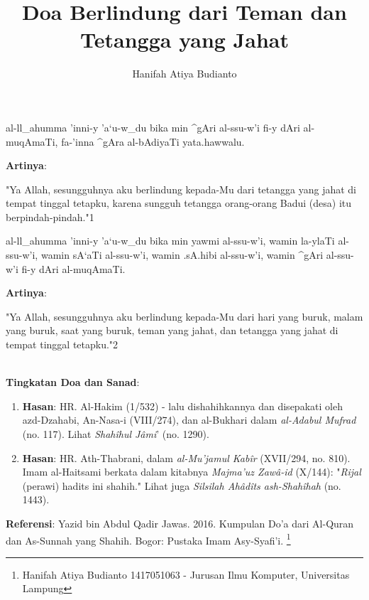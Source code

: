 \documentclass[a4paper,12pt]{article}
\title{\Large Doa Berlindung dari Teman dan Tetangga yang Jahat}
\author{\calligra Hanifah Atiya Budianto}
\begin{document}
\sffamily
\maketitle 
\fullvocalize
{}
\begin{arabtext}
\noindent
al-ll_ahumma 'inni-y 'a`u-w_du bika min ^gAri al-ssu-w'i fi-y dAri 
al-muqAmaTi, fa-'inna ^gAra al-bAdiyaTi yata.hawwalu.\\
\end{arabtext}
\noindent
\textbf{Artinya}:
\par
\indent
"Ya Allah, sesungguhnya aku berlindung kepada-Mu dari tetangga yang jahat 
di tempat tinggal tetapku, karena sungguh tetangga orang-orang Badui (desa)
itu berpindah-pindah."{\scriptsize 1}\\
\begin{arabtext}
\noindent
al-ll_ahumma 'inni-y 'a`u-w_du bika min yawmi al-ssu-w'i, wamin la-ylaTi 
al-ssu-w'i, wamin sA`aTi al-ssu-w'i, wamin .sA.hibi al-ssu-w'i, 
wamin ^gAri al-ssu-w'i fi-y dAri al-muqAmaTi.\\
\end{arabtext}
\noindent
\textbf{Artinya}:
\par
\indent
"Ya Allah, sesungguhnya aku berlindung kepada-Mu dari hari yang buruk, 
malam yang buruk, saat yang buruk, teman yang jahat, dan tetangga yang 
jahat di tempat tinggal tetapku."{\scriptsize 2}\\\\
\par
\noindent
\textbf{Tingkatan Doa dan Sanad}:
\begin{enumerate}
\item \textbf{Hasan}: HR. Al-Hakim (1/532) - lalu dishahihkannya dan 
disepakati oleh azd-Dzahabi, An-Nasa-i (VIII/274), dan al-Bukhari dalam 
\textit{al-Adabul Mufrad} (no. 117). Lihat \textit{Shah\^{i}hul J\^{a}mi}' 
(no. 1290). 
\item \textbf{Hasan}: HR. Ath-Thabrani, dalam \textit{al-Mu'jamul 
Kab\^{i}r} (XVII/294, no. 810). Imam al-Haitsami berkata dalam kitabnya 
\textit{Majma'uz Zaw\^{a}-id} (X/144): "\textit{Rijal} (perawi) hadits ini 
shahih." Lihat juga \textit{Silsilah Ah\^{a}d\^{i}ts ash-Shah\^{i}hah} (no.
1443).
\end{enumerate}
\textbf{Referensi}: Yazid bin Abdul Qadir Jawas. 2016. Kumpulan Do'a dari
Al-Quran dan As-Sunnah yang Shahih. Bogor: Pustaka Imam Asy-Syafi'i.
\footnote{Hanifah Atiya Budianto 1417051063 - Jurusan Ilmu Komputer,
Universitas Lampung}
\end{document}
